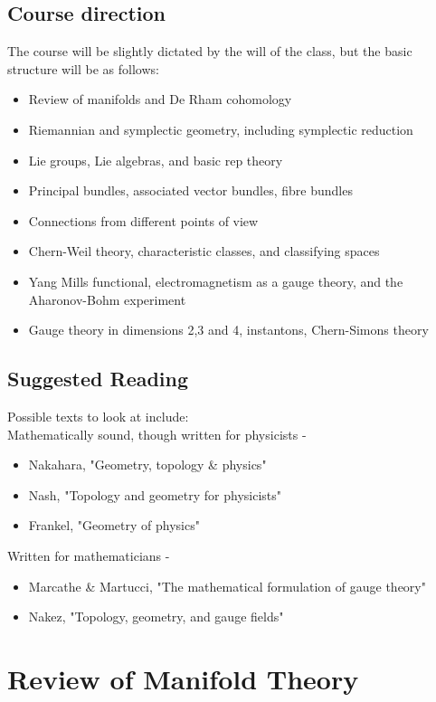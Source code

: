 \documentclass{article}
\begin{document}
\subsection{Course direction}
The course will be slightly dictated by the will of the class, but the basic structure will be as follows:
\begin{itemize}
    \item Review of manifolds and De Rham cohomology
    \item Riemannian and symplectic geometry, including symplectic reduction
    \item Lie groups, Lie algebras, and basic rep theory
    \item Principal bundles, associated vector bundles, fibre bundles
    \item Connections from different points of view 
    \item Chern-Weil theory, characteristic classes, and classifying spaces
    \item Yang Mills functional, electromagnetism as a gauge theory, and the Aharonov-Bohm experiment
    \item Gauge theory in dimensions 2,3 and 4, instantons, Chern-Simons theory
\end{itemize}
\subsection{Suggested Reading}
Possible texts to look at include: \\
Mathematically sound, though written for physicists - 
\begin{itemize}
    \item Nakahara, "Geometry, topology \& physics" 
    \item Nash, "Topology and geometry for physicists" 
    \item Frankel, "Geometry of physics" 
\end{itemize}
Written for mathematicians - 
\begin{itemize}
    \item Marcathe \& Martucci, "The mathematical formulation of gauge theory"
    \item Nakez, "Topology, geometry, and gauge fields"
\end{itemize}
\section{Review of Manifold Theory}
\end{document}
